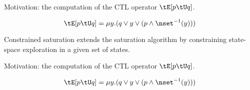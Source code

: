 Motivation: the computation of the CTL operator $\tE [p \tU q]$.


$$\tE[p \tU q] = \mu y.(q \lor y \lor (p \land \nset^{-1}(y)))$$

\vfill


\vfill
Constrained saturation extends the saturation algorithm by constraining state-space exploration in a given set of states.

Motivation: the computation of the CTL operator $\tE [p \tU q]$.


$$\tE[p \tU q] = \mu y.(q \lor y \lor (p \land \nset^{-1}(y)))$$

\vfill

